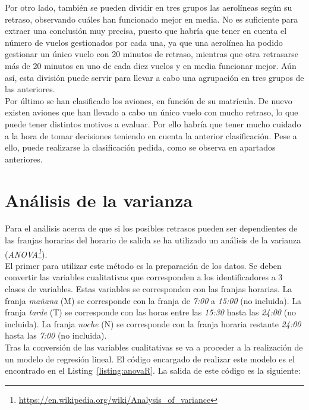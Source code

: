 \documentclass{article}
\begin{document}
Por otro lado, también se pueden dividir en tres grupos las aerolíneas según su retraso, observando cuáles han funcionado mejor en media. No es suficiente para extraer una conclusión muy precisa, puesto que habría que tener en cuenta el número de vuelos gestionados por cada una, ya que una aerolínea ha podido gestionar un único vuelo con 20 minutos de retraso, mientras que otra retrasarse más de 20 minutos en uno de cada diez vuelos y en media funcionar mejor. Aún así, esta división puede servir para llevar a cabo una agrupación en tres grupos de las anteriores.\\

Por último se han clasificado los aviones, en función de su matrícula. De nuevo existen aviones que han llevado a cabo un único vuelo con mucho retraso, lo que puede tener distintos motivos a evaluar. Por ello habría que tener mucho cuidado a la hora de tomar decisiones teniendo en cuenta la anterior clasificación. Pese a ello, puede realizarse la clasificación pedida, como se observa en apartados anteriores.\\



\section{Análisis de la varianza}

Para el análisis acerca de que si los posibles retrasos pueden ser dependientes de las franjas horarias del horario de salida se ha utilizado un análisis de la varianza (\textit{ANOVA\footnote{\url{https://en.wikipedia.org/wiki/Analysis_of_variance}}}).\\

El primer para utilizar este método es la preparación de los datos. Se deben convertir las variables cualitativas que corresponden a los identificadores a 3 clases de variables. Estas variables se corresponden con las franjas horarias. La franja \textit{mañana} (M) se corresponde con la franja de \textit{7:00} a \textit{15:00} (no incluida). La franja \textit{tarde} (T) se corresponde con las horas entre las \textit{15:30} hasta las \textit{24:00} (no incluida). La franja \textit{noche} (N) se corresponde con la franja horaria restante \textit{24:00} hasta las \textit{7:00} (no incluida).\\

Tras la conversión de las variables cualitativas se va a proceder a la realización de un modelo de regresión lineal. El código encargado de realizar este modelo es el encontrado en el Listing~\ref{listing:anovaR}. La salida de este código es la siguiente:
\end{document}
